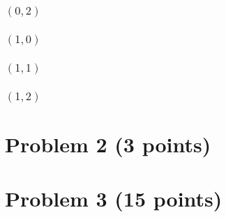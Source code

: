 \documentclass[10pt]{article}
\begin{document}
\subsubsection*{$(0, 2)$}

\subsubsection*{$(1, 0)$}

\subsubsection*{$(1, 1)$}

\subsubsection*{$(1, 2)$}

\section*{Problem 2 (3 points)}

\section*{Problem 3 (15 points)}
\end{document}
